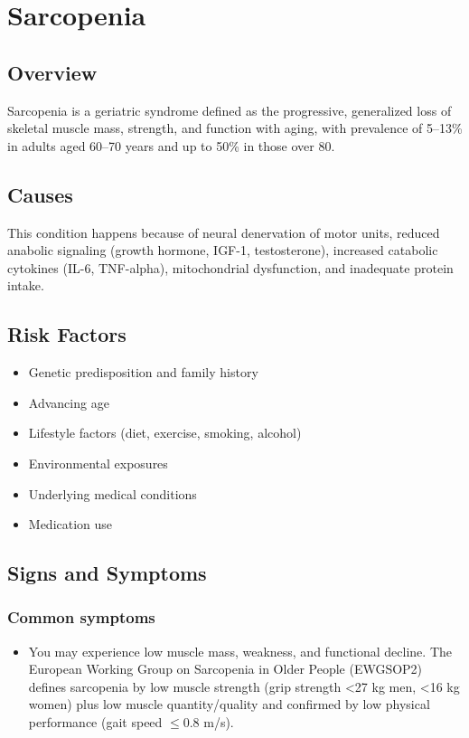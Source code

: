 \chapter{Sarcopenia}
\label{sec:Sarcopenia}

\section{Overview}
Sarcopenia is a geriatric syndrome defined as the progressive, generalized loss of skeletal muscle mass, strength, and function with aging, with prevalence of 5--13\% in adults aged 60--70 years and up to 50\% in those over 80.
\section{Causes}
This condition happens because of neural denervation of motor units, reduced anabolic signaling (growth hormone, IGF-1, testosterone), increased catabolic cytokines (IL-6, TNF-alpha), mitochondrial dysfunction, and inadequate protein intake.     
\section{Risk Factors}

\begin{itemize}[noitemsep]
  \item Genetic predisposition and family history
  \item Advancing age
  \item Lifestyle factors (diet, exercise, smoking, alcohol)
  \item Environmental exposures
  \item Underlying medical conditions
  \item Medication use
\end{itemize}
\section{Signs and Symptoms}

\subsection{Common symptoms}
\begin{itemize}[noitemsep]
  \item You may experience low muscle mass, weakness, and functional decline. The European Working Group on Sarcopenia in Older People (EWGSOP2) defines sarcopenia by low muscle strength (grip strength <27 kg men, <16 kg women) plus low muscle quantity/quality and confirmed by low physical performance (gait speed $\leq$0.8 m/s). 
  \end{itemize}

